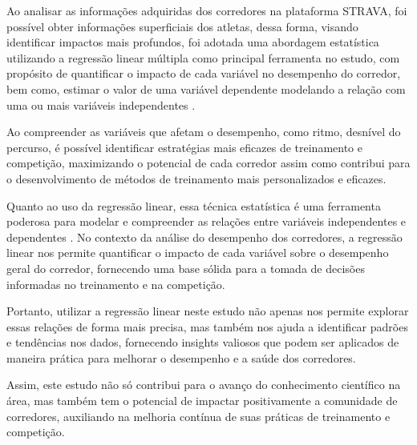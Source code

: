 Ao analisar as informações adquiridas dos corredores na plataforma STRAVA, foi possível obter informações superficiais dos atletas, dessa forma, visando identificar impactos mais profundos, foi adotada uma abordagem estatística utilizando a regressão linear múltipla como principal ferramenta no estudo, com propósito de quantificar o impacto de cada variável no desempenho do corredor, bem como, estimar o valor de uma variável dependente modelando a relação com uma ou mais variáveis independentes \cite{hoffmann}. 

Ao compreender as variáveis que afetam o desempenho, como ritmo, desnível do percurso, é possível identificar estratégias mais eficazes de treinamento e competição, maximizando o potencial de cada corredor assim como contribui para o desenvolvimento de métodos de treinamento mais personalizados e eficazes. 

Quanto ao uso da regressão linear, essa técnica estatística é uma ferramenta poderosa para modelar e compreender as relações entre variáveis independentes e dependentes \cite{hoffmann}.  No contexto da análise do desempenho dos corredores, a regressão linear nos permite quantificar o impacto de cada variável sobre o desempenho geral do corredor, fornecendo uma base sólida para a tomada de decisões informadas no treinamento e na competição. 

Portanto, utilizar a regressão linear neste estudo não apenas nos permite explorar essas relações de forma mais precisa, mas também nos ajuda a identificar padrões e tendências nos dados, fornecendo insights valiosos que podem ser aplicados de maneira prática para melhorar o desempenho e a saúde dos corredores. 

Assim, este estudo não só contribui para o avanço do conhecimento científico na área, mas também tem o potencial de impactar positivamente a comunidade de corredores, auxiliando na melhoria contínua de suas práticas de treinamento e competição.
















